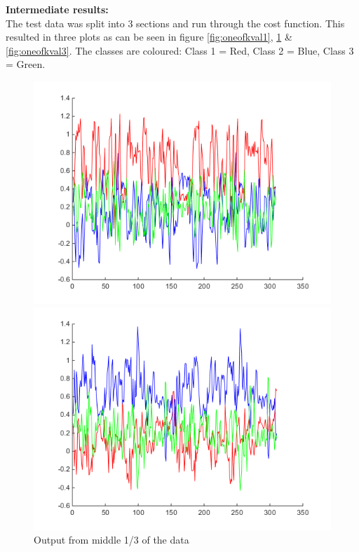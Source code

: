 \textbf{Intermediate results:}\\
The test data was split into 3 sections and run through the cost function. This resulted in three plots as can be seen in figure \ref{fig:oneofkval1}, \ref{fig:oneofkval2} \& \ref{fig:oneofkval3}. The classes are coloured: Class 1 = Red, Class 2 = Blue, Class 3 = Green.
\begin{figure}[H]
  \includegraphics[width=\linewidth]{billeder/oneofkval1}
  \caption{Output from first 1/3 of the data}\label{fig:oneofkval1}
\endminipage\hfill
{}
  \includegraphics[width=\linewidth]{billeder/oneofkval2}
  \caption{Output from middle 1/3 of the data}\label{fig:oneofkval2}
\endminipage\hfill

\end{figure}
